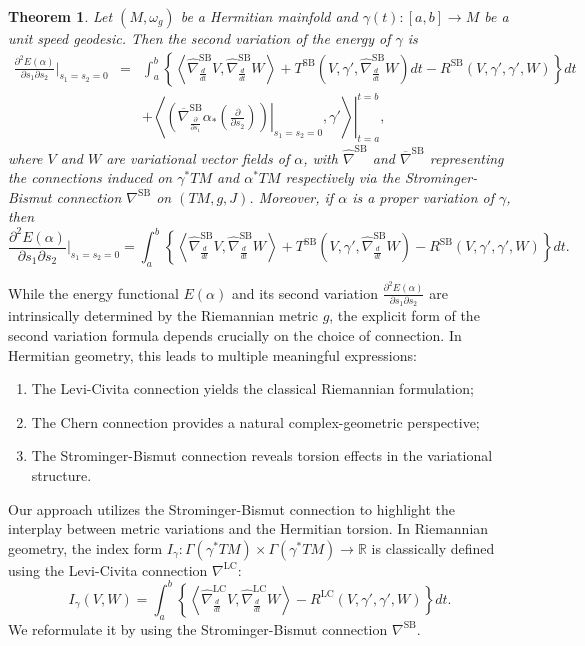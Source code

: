 \documentclass[12pt, reqno]{amsart}
\theoremstyle{plain}
\newtheorem{thm}{Theorem}[section]
\theoremstyle{definition}
\newcommand{\p}{\partial}
\renewcommand{\bar}{\overline}
\newcommand{\beq}{\begin{equation}}
\newcommand{\eeq}{\end{equation}}
\newcommand{\bd}{\begin{enumerate}}
\newcommand{\ed}{\end{enumerate}}
\renewcommand{\hat}{\widehat}
\renewcommand{\>}{\rightarrow}
\newcommand{\R}{{\mathbb R}}
\newcommand{\LL}{\left\langle}
\newcommand{\RL}{\right\rangle}
\newcommand{\MS}{\mathrm{SB}}
\newcommand{\MLC}{\mathrm{LC}}
\renewcommand{\>}{\rightarrow}
\renewcommand{\p}{{\partial}}
\numberwithin{equation}{section} %
\begin{document}
    \begin{thm}\label{thm-2nd}
    Let $(M,\omega_g)$ be a Hermitian mainfold and $\gamma(t):[a,b]\to M$ be a unit speed geodesic. Then the second variation of the energy of $\gamma$ is
    \begin{eqnarray}
    \frac{\p^2  E(\alpha)}{\p s_1\p s_2}\bigg|_{s_1=s_2=0}
    \nonumber&=&\int_a^b\left\{\LL\hat{\nabla}^{\MS}_{\frac{d}{d t}}V,\hat{\nabla}^{\MS}_{\frac{d}{d t}}W\RL+T^{\MS}\left(V,\gamma',\hat{\nabla}^{\MS}_{\frac{d}{d t}}W\right) dt-R^{\MS}(V,\gamma',\gamma',W)\right\}dt\\
    &&+\left.\LL\left.\left(\bar{\nabla}^\MS_{\frac{\p}{\p s_1}}\alpha_*\left(\frac{\p}{\p s_2}\right)\right)\right|_{s_1=s_2=0},\gamma'\RL\right|_{t=a}^{t=b},\label{2nd}
    \end{eqnarray}
    where  $V$ and $W$ are variational vector fields of $\alpha$, with
    $\hat{\nabla}^{\mathrm{SB}}$ and $\bar{\nabla}^{\mathrm{SB}}$ representing the connections
    induced on  $\gamma^*TM$ and $\alpha^*TM$ respectively via the
    Strominger-Bismut connection $\nabla^{\mathrm{SB}}$ on $(TM, g, J)$. Moreover,  if $\alpha$ is a proper variation of $\gamma$, then \beq
    \frac{\p^2  E(\alpha)}{\p s_1\p s_2}\bigg|_{s_1=s_2=0}=\int_a^b\left\{\LL\hat{\nabla}^{\MS}_{\frac{d}{d t}}V,\hat{\nabla}^{\MS}_{\frac{d}{d t}}W\RL+T^{\MS}\left(V,\gamma',\hat{\nabla}^{\MS}_{\frac{d}{d t}}W\right)-R^{\MS}(V,\gamma',\gamma',W)\right\}dt. \label{normalsecondvariation}
    \eeq
   \end{thm}

\noindent
While the energy functional $E(\alpha)$  and its second variation  $\frac{\p^2  E(\alpha)}{\p s_1\p s_2}$ are intrinsically determined by the Riemannian metric
$g$, the explicit form of the second variation formula depends crucially on the choice of connection. In Hermitian geometry, this leads to multiple meaningful expressions:
\bd
    \item The Levi-Civita connection yields the classical Riemannian formulation;
    \item The Chern connection provides a natural complex-geometric perspective;
    \item The Strominger-Bismut connection reveals torsion effects in the variational structure.
\ed
Our approach utilizes the Strominger-Bismut connection to highlight the interplay between metric variations and the Hermitian torsion. In Riemannian geometry, the index form $I_\gamma: \Gamma(\gamma^*TM)\times \Gamma(\gamma^*TM)\>\R$ is classically defined using the Levi-Civita connection  $\nabla^\MLC$:
\beq I_\gamma(V,W) =\int_a^b\left\{\LL\hat{\nabla}^{\text{LC}}_{\frac{d}{dt}}V,\hat{\nabla}^{\text{LC}}_{\frac{d}{dt}}W\RL-R^{\text{LC}}(V,\gamma',\gamma',W)\right\}dt. \eeq
We   reformulate it by using  the Strominger-Bismut connection $\nabla^\MS$.
\end{document}
